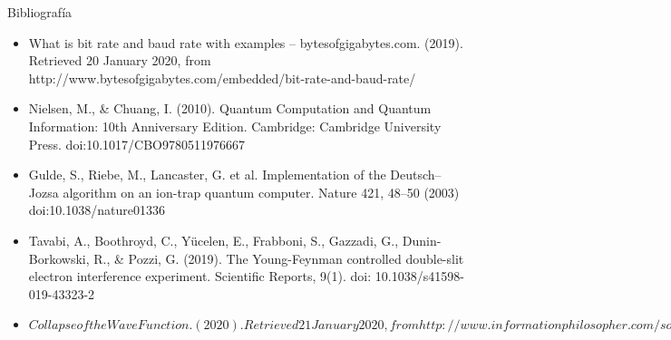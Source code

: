 \documentclass{beamer}
\begin{document}
\begin{frame}{Bibliografía}
	\begin{itemize}
		\item What is bit rate and baud rate with examples – bytesofgigabytes.com. (2019). Retrieved 20 January 2020, from http://www.bytesofgigabytes.com/embedded/bit-rate-and-baud-rate/
		      \newline
		\item {Nielsen, M., \& Chuang, I. (2010). Quantum Computation and Quantum Information: 10th Anniversary Edition. Cambridge: Cambridge University Press. doi:10.1017/CBO9780511976667}
		      \newline
		\item {Gulde, S., Riebe, M., Lancaster, G. et al. Implementation of the Deutsch–Jozsa algorithm on an ion-trap quantum computer. Nature 421, 48–50 (2003) doi:10.1038/nature01336}
		\item Tavabi, A., Boothroyd, C., Yücelen, E., Frabboni, S., Gazzadi, G., Dunin-Borkowski, R., \& Pozzi, G. (2019). The Young-Feynman controlled double-slit electron interference experiment. Scientific Reports, 9(1). doi: 10.1038/s41598-019-43323-2
		\item $Collapse of the Wave Function. (2020). Retrieved 21 January 2020, from http://www.informationphilosopher.com/solutions/experiments/wave-function_collapse/$
	\end{itemize}
\end{frame}
\end{document}
